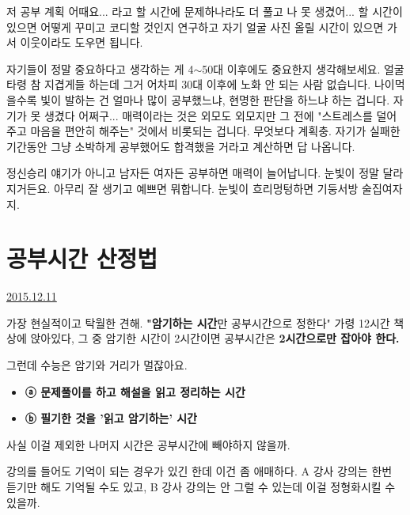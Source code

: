 저 공부 계획 어때요... 라고 할 시간에 문제하나라도 더 풀고
나 못 생겼어... 할 시간이 있으면 어떻게 꾸미고 코디할 것인지 연구하고
자기 얼굴 사진 올릴 시간이 있으면 가서 이웃이라도 도우면 됩니다.
\vspace{5mm}

자기들이 정말 중요하다고 생각하는 게 4$\sim$50대 이후에도 중요한지 생각해보세요.
얼굴 타령 참 지겹게들 하는데 그거 어차피 30대 이후에 노화 안 되는 사람 없습니다.
나이먹을수록 빛이 발하는 건 얼마나 많이 공부했느냐, 현명한 판단을 하느냐 하는 겁니다.
자기가 못 생겼다 어쩌구... 매력이라는 것은 외모도 외모지만
그 전에 "스트레스를 덜어주고 마음을 편안히 해주는" 것에서 비롯되는 겁니다.
무엇보다 계획충. 자기가 실패한 기간동안 그냥 소박하게 공부했어도 합격했을 거라고 계산하면 답 나옵니다.
\vspace{5mm}

정신승리 얘기가 아니고 남자든 여자든 공부하면 매력이 늘어납니다.
눈빛이 정말 달라지거든요.
아무리 잘 생기고 예쁘면 뭐합니다. 눈빛이 흐리멍텅하면 기둥서방 술집여자지.
\vspace{5mm}








\section{공부시간 산정법}
\href{https://www.kockoc.com/Apoc/539674}{2015.12.11}

\vspace{5mm}

가장 현실적이고 탁월한 견해.
\textbf{"암기하는 시간}만 공부시간으로 정한다"
가령 12시간 책상에 앉아있다, 그 중 암기한 시간이 2시간이면 공부시간은 \textbf{2시간으로만 잡아야 한다.}
\vspace{5mm}

그런데 수능은 암기와 거리가 멀잖아요.
\vspace{5mm}

\begin{itemize}
    \item[] \textbf{ⓐ 문제풀이를 하고 해설을 읽고 정리하는 시간}
    \item[] \textbf{ⓑ 필기한 것을 '읽고 암기하는' 시간}
\end{itemize}
\vspace{5mm}

사실 이걸 제외한 나머지 시간은 공부시간에 빼야하지 않을까.
\vspace{5mm}

강의를 들어도 기억이 되는 경우가 있긴 한데 이건 좀 애매하다.
A 강사 강의는 한번 듣기만 해도 기억될 수도 있고, B 강사 강의는 안 그럴 수 있는데 이걸 정형화시킬 수 있을까.
\vspace{5mm}

